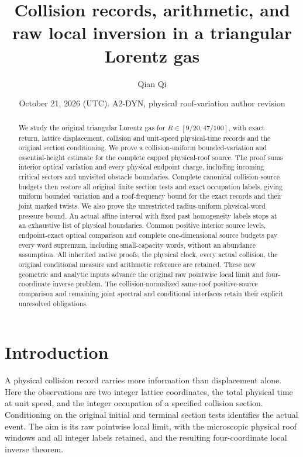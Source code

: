 \documentclass[11pt,reqno]{amsart}
\title[Collision records and raw local inversion]{Collision records, arithmetic, and raw local inversion in a triangular Lorentz gas}
\author{Qian Qi}
\date{October 21, 2026 (UTC). A2-DYN, physical roof-variation author revision}
\numberwithin{equation}{section}
\theoremstyle{definition}\newtheorem{definition}[theorem]{Definition}
\theoremstyle{remark}\newtheorem{remark}[theorem]{Remark}
\begin{document}
\raggedbottom
\begin{abstract}
We study the original triangular Lorentz gas for
$R\in[9/20,47/100]$, with exact return, lattice displacement,
collision and unit-speed physical-time records and the original
section conditioning. We prove a collision-uniform bounded-variation
and essential-height estimate for the complete capped physical-roof
source. The proof sums interior optical variation and every physical
endpoint charge, including incoming critical sectors and unvisited
obstacle boundaries. Complete canonical collision-source budgets
then restore all original finite section tests and exact occupation
labels, giving uniform bounded variation and a roof-frequency bound
for the exact records and their joint marked twists.
We also prove the unrestricted radius-uniform physical-word pressure
bound. An actual affine interval with fixed past homogeneity labels
stops at an exhaustive list of physical boundaries. Common positive
interior source levels, endpoint-exact optical comparison and complete
one-dimensional source budgets pay every word supremum, including
small-capacity words, without an abundance assumption.
All inherited native proofs, the physical clock, every actual
collision, the original conditional measure and arithmetic reference
are retained. These new geometric and analytic inputs advance the
original raw pointwise local limit and four-coordinate inverse problem.
The collision-normalized same-roof positive-source comparison and
remaining joint spectral and conditional interfaces retain their
explicit unresolved obligations.
\end{abstract}
\maketitle

\section*{Introduction}
A physical collision record carries more information than displacement
alone. Here the observations are two integer lattice coordinates, the
total physical time at unit speed, and the integer occupation of a
specified collision section. Conditioning on the original initial
and terminal section tests identifies the actual event. The aim is
its raw pointwise local limit, with the microscopic physical roof
windows and all integer labels retained, and the resulting
four-coordinate local inverse theorem.
\end{document}
